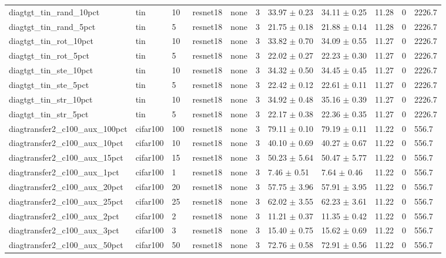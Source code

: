 \begin{tabular}{lllllllllll}
diagtgt_tin_rand_10pct & tin & 10 & resnet18 & none & 3 & 33.97 $\pm$ 0.23 & 34.11 $\pm$ 0.25 & 11.28 & 0 & 2226.7 \\
diagtgt_tin_rand_5pct & tin & 5 & resnet18 & none & 3 & 21.75 $\pm$ 0.18 & 21.88 $\pm$ 0.14 & 11.28 & 0 & 2226.7 \\
diagtgt_tin_rot_10pct & tin & 10 & resnet18 & none & 3 & 33.82 $\pm$ 0.70 & 34.09 $\pm$ 0.55 & 11.27 & 0 & 2226.7 \\
diagtgt_tin_rot_5pct & tin & 5 & resnet18 & none & 3 & 22.02 $\pm$ 0.27 & 22.23 $\pm$ 0.30 & 11.27 & 0 & 2226.7 \\
diagtgt_tin_ste_10pct & tin & 10 & resnet18 & none & 3 & 34.32 $\pm$ 0.50 & 34.45 $\pm$ 0.45 & 11.27 & 0 & 2226.7 \\
diagtgt_tin_ste_5pct & tin & 5 & resnet18 & none & 3 & 22.42 $\pm$ 0.12 & 22.61 $\pm$ 0.11 & 11.27 & 0 & 2226.7 \\
diagtgt_tin_str_10pct & tin & 10 & resnet18 & none & 3 & 34.92 $\pm$ 0.48 & 35.16 $\pm$ 0.39 & 11.27 & 0 & 2226.7 \\
diagtgt_tin_str_5pct & tin & 5 & resnet18 & none & 3 & 22.17 $\pm$ 0.38 & 22.36 $\pm$ 0.35 & 11.27 & 0 & 2226.7 \\
diagtransfer2_c100_aux_100pct & cifar100 & 100 & resnet18 & none & 3 & 79.11 $\pm$ 0.10 & 79.19 $\pm$ 0.11 & 11.22 & 0 & 556.7 \\
diagtransfer2_c100_aux_10pct & cifar100 & 10 & resnet18 & none & 3 & 40.10 $\pm$ 0.69 & 40.27 $\pm$ 0.67 & 11.22 & 0 & 556.7 \\
diagtransfer2_c100_aux_15pct & cifar100 & 15 & resnet18 & none & 3 & 50.23 $\pm$ 5.64 & 50.47 $\pm$ 5.77 & 11.22 & 0 & 556.7 \\
diagtransfer2_c100_aux_1pct & cifar100 & 1 & resnet18 & none & 3 & 7.46 $\pm$ 0.51 & 7.64 $\pm$ 0.46 & 11.22 & 0 & 556.7 \\
diagtransfer2_c100_aux_20pct & cifar100 & 20 & resnet18 & none & 3 & 57.75 $\pm$ 3.96 & 57.91 $\pm$ 3.95 & 11.22 & 0 & 556.7 \\
diagtransfer2_c100_aux_25pct & cifar100 & 25 & resnet18 & none & 3 & 62.02 $\pm$ 3.55 & 62.23 $\pm$ 3.61 & 11.22 & 0 & 556.7 \\
diagtransfer2_c100_aux_2pct & cifar100 & 2 & resnet18 & none & 3 & 11.21 $\pm$ 0.37 & 11.35 $\pm$ 0.42 & 11.22 & 0 & 556.7 \\
diagtransfer2_c100_aux_3pct & cifar100 & 3 & resnet18 & none & 3 & 15.40 $\pm$ 0.75 & 15.62 $\pm$ 0.69 & 11.22 & 0 & 556.7 \\
diagtransfer2_c100_aux_50pct & cifar100 & 50 & resnet18 & none & 3 & 72.76 $\pm$ 0.58 & 72.91 $\pm$ 0.56 & 11.22 & 0 & 556.7 \\

\end{tabular}
